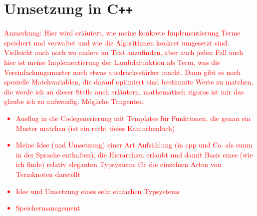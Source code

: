 \documentclass{article}
\begin{document}
\section{Umsetzung in C\texttt{++}}
\textcolor{red}{
\begin{itshape}
Anmerkung: Hier wird erläutert, wie meine konkrete Implementierung Terme speichert und verwaltet und wie die Algorithmen konkret umgesetzt sind. Vielleicht auch noch wo anders im Text anzufinden, aber auch jeden Fall auch hier ist meine Implementierung der Lambdafunktion als Term, was die Vereinfachungsmuster noch etwas ausdrucksstärker macht. Dann gibt es noch spezielle Matchvariablen, die darauf optimiert sind bestimmte Werte zu matchen, die werde ich an dieser Stelle auch erläutern, mathematisch rigoros ist mir das glaube ich zu aufwendig.
Mögliche Tangenten:
\begin{itemize}
\item {Ausflug in die Codegenerierung mit Templates für Funktionen, die genau ein Muster matchen (ist ein recht tiefes Kaninchenloch)}
\item {Meine Idee (und Umsetzung) einer Art Aufzählung (in cpp und Co. als enum in der Sprache enthalten), die Hierarchien erlaubt und damit Basis eines (wie ich finde) relativ eleganten Typsystems für die einzelnen Arten von Termknoten darstellt}
\item {Idee und Umsetzung eines sehr einfachen Typsystems}
\item {Speichermanagement}
\end{itemize}
\end{itshape}
}
\end{document}
